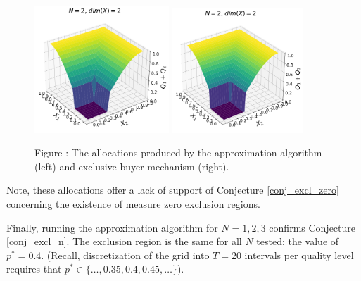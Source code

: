 \documentclass{article}
\newcounter{fig}
\begin{document}
\begin{figure}[H]
    \begin{center}
    \includegraphics[width=0.45\textwidth]{images/symmetric_independent_beta.png}
    \includegraphics[width=0.44\textwidth]{images/symmetric_independent_beta_ebm.png}
    \end{center}
    
    \vspace{1mm}
    \raggedright{\small {\sc Figure \thefig\label{fig:beta12_alloc}:} The allocations produced by the approximation algorithm (left) and exclusive buyer mechanism (right).} 
\end{figure}


\noindent Note, these allocations offer a lack of support of Conjecture \ref{conj_excl_zero} concerning the existence of measure zero exclusion regions.

Finally, running the approximation algorithm for $N=1,2,3$ confirms Conjecture \ref{conj_excl_n}. The exclusion region is the same for all $N$ tested: the value of $p^*=0.4$. (Recall, discretization of the grid into $T=20$ intervals per quality level requires that $p^* \in \{\dots, 0.35, 0.4, 0.45, \dots\}$).  

\end{document}
